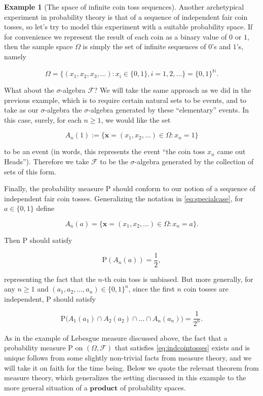 \documentclass[11pt]{report}
\providecommand{\cal}{\mathcal}
\theoremstyle{plain}
\theoremstyle{definition}
\newtheorem{example}[thm]{Example}
\begin{document}
\begin{example}[The space of infinite coin toss sequences]
Another archetypical experiment in probability theory
is that of a sequence of independent fair coin tosses,
so let's try to model this experiment with a suitable
probability space. If for convenience we represent the
result of each coin as a binary value of $0$ or $1$,
then the sample space $\Omega$ is simply the set of
infinite sequences of $0$'s and $1$'s, namely

\[
\Omega = \big\{ (x_1, x_2, x_3, \ldots) : x_i \in \{0,1\}, i=1,2,\ldots \big\}
= \{ 0,1 \}^{\mathbb{N}}.
\]

\noindent What about the $\sigma$-algebra ${\cal F}$? We will
take the same approach as we did in the previous
example, which is to require certain natural sets to
be events, and to take as our $\sigma$-algebra the
$\sigma$-algebra generated by these ``elementary''
events. In this case, surely, for each $n\ge 1$, we
would like the set

\begin{equation*}
A_n(1) := \{ \mathbf{x}=(x_1,x_2,\ldots) \in \Omega : x_n = 1 \} \tag{2}\label{eq:specialcase}
\end{equation*}

\noindent to be an event (in words, this represents the event
``the coin toss $x_n$ came out Heads''). Therefore we
take ${\cal F}$ to be the $\sigma$-algebra generated
by the collection of sets of this form.

Finally, the probability measure $\mathrm{P}$ should
conform to our notion of a sequence of independent
fair coin tosses. Generalizing the notation in
\eqref{eq:specialcase}, for $a\in\{0,1\}$ define

\[
A_n(a) = \{ \mathbf{x}=(x_1,x_2,\ldots) \in \Omega : x_n = a \}.
\]

\noindent Then $\mathrm{P}$ should satisfy

\[
\mathrm{P}(A_n(a)) = \frac12,
\]

\noindent representing the fact that the $n$-th coin toss is
unbiased. But more generally, for any $n\ge 1$ and
$(a_1,a_2,\ldots,a_n) \in \{0,1\}^n$, since the first
$n$ coin tosses are independent, $\mathrm{P}$ should
satisfy

\begin{equation*} \tag{3}\label{eq:indcointosses}
\mathrm{P}\big(A_1(a_1) \cap A_2(a_2) \cap \ldots \cap A_n(a_n)\big) = \frac{1}{2^n}.
\end{equation*}

\noindent As in the example of Lebesgue measure discussed
above, the fact that a probability measure
$\mathrm{P}$  on $(\Omega, {\cal F})$ that satisfies
\eqref{eq:indcointosses} exists and is unique follows from
some slightly non-trivial facts from measure theory,
and we will take it on faith for the time being. Below
we quote the relevant theorem from measure theory,
which generalizes the setting discussed in this
example to the more general situation of a
$\textbf{product}$ of probability spaces.
\end{example}
\end{document}
